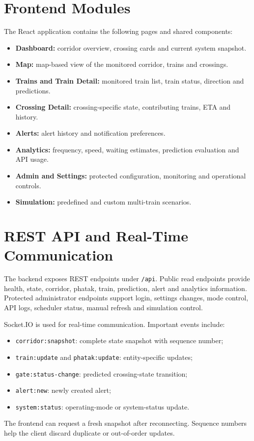 \documentclass[11pt,a4paper]{report}
\begin{document}
\section{Frontend Modules}
The React application contains the following pages and shared components:
\begin{itemize}
  \item \textbf{Dashboard:} corridor overview, crossing cards and current system snapshot.
  \item \textbf{Map:} map-based view of the monitored corridor, trains and crossings.
  \item \textbf{Trains and Train Detail:} monitored train list, train status, direction and predictions.
  \item \textbf{Crossing Detail:} crossing-specific state, contributing trains, ETA and history.
  \item \textbf{Alerts:} alert history and notification preferences.
  \item \textbf{Analytics:} frequency, speed, waiting estimates, prediction evaluation and API usage.
  \item \textbf{Admin and Settings:} protected configuration, monitoring and operational controls.
  \item \textbf{Simulation:} predefined and custom multi-train scenarios.
\end{itemize}

\section{REST API and Real-Time Communication}
The backend exposes REST endpoints under \texttt{/api}. Public read endpoints provide health, state, corridor, phatak, train, prediction, alert and analytics information. Protected administrator endpoints support login, settings changes, mode control, API logs, scheduler status, manual refresh and simulation control.

Socket.IO is used for real-time communication. Important events include:
\begin{itemize}
  \item \texttt{corridor:snapshot}: complete state snapshot with sequence number;
  \item \texttt{train:update} and \texttt{phatak:update}: entity-specific updates;
  \item \texttt{gate:status-change}: predicted crossing-state transition;
  \item \texttt{alert:new}: newly created alert;
  \item \texttt{system:status}: operating-mode or system-status update.
\end{itemize}
The frontend can request a fresh snapshot after reconnecting. Sequence numbers help the client discard duplicate or out-of-order updates.
\end{document}
